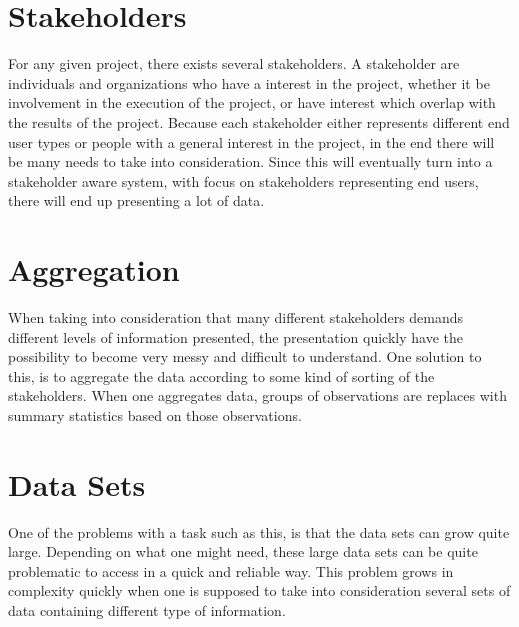 \section{Stakeholders} %
\label{sec:intro_stakeholders}  
For any given project, there exists
several stakeholders. A stakeholder are individuals and organizations who have a interest in the
project, whether it be involvement in the execution of the project, or have interest which overlap
with the results of the project. Because each stakeholder either represents different end user 
types or people with a general interest in the project, in the end there will be many needs to 
take into consideration. Since this will eventually turn into a stakeholder aware system, with 
focus on stakeholders representing end users, there will end up presenting a lot of data. 

\section{Aggregation} %
\label{sec:intro_aggregation}
When taking into consideration that many different stakeholders demands different levels of
information presented, the presentation quickly have the possibility to become very messy and
difficult to understand. One solution to this, is to aggregate the data according to some kind of
sorting of the stakeholders. When one aggregates data, groups of observations are replaces with
summary statistics based on those observations\cite{wikiAggregation}.

\section{Data Sets} %
\label{sec:intro_data_sets}
One of the problems with a task such as this, is that the data sets can grow quite large. Depending
on what one might need, these large data sets can be quite problematic to access in a quick and
reliable way. This problem grows in complexity quickly when one is supposed to take into
consideration several sets of data containing different type of information. 

